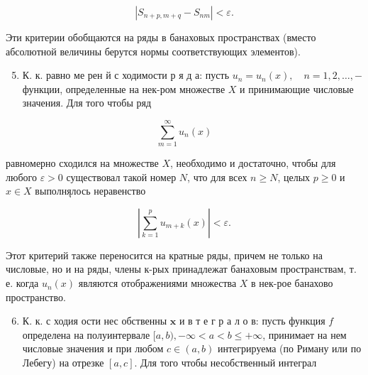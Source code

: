 \documentclass[10pt]{article}
\begin{document}
\[

\left|S_{n+p, m+q}-S_{n m}\right|<\varepsilon .

\]



Эти критерии обобщаются на ряды в банаховых пространствах (вместо абсолютной величины берутся нормы соответствующих элементов).



\begin{enumerate}

  \setcounter{enumi}{4}

  \item К. к. равно ме рен й с ходимости р я д а: пусть $u_{n}=u_{n}(x), \quad n=1,2, \ldots,-$ функции, определенные на нек-ром множестве $X$ и принимающие числовые значения. Для того чтобы ряд

\end{enumerate}



\[

\sum_{m=1}^{\infty} u_{n}(x)

\]



равномерно сходился на множестве $X$, необходимо и достаточно, чтобы для любого $\varepsilon>0$ существовал такой номер $N$, что для всех $n \geqslant N$, целых $p \geqslant 0$ и $x \in X$ выполняุлось неравенство



\[

\left|\sum_{k=1}^{p} u_{m+k}(x)\right|<\varepsilon .

\]



Этот критерий также переносится на кратные ряды, причем не только на числовые, но и на ряды, члены к-рых принадлежат банаховым пространствам, т. е. когда $u_{n}(x)$ являются отображениями множества $X$ в нек-рое банахово пространство.



\begin{enumerate}

  \setcounter{enumi}{5}

  \item К. к. с ходия ости нес обственны $\mathbf{x}$ и в т е г р а л о в: пусть функция $f$ определена на полуинтервале $[a, b),-\infty<a<b \leqslant+\infty$, принимает на нем числовые значения и при любом $c \in(a, b)$ интегрируема (по Риману или по Лебегу) на отрезке $[a, c]$. Для того чтобы несобственный интеграл

\end{enumerate}
\end{document}
